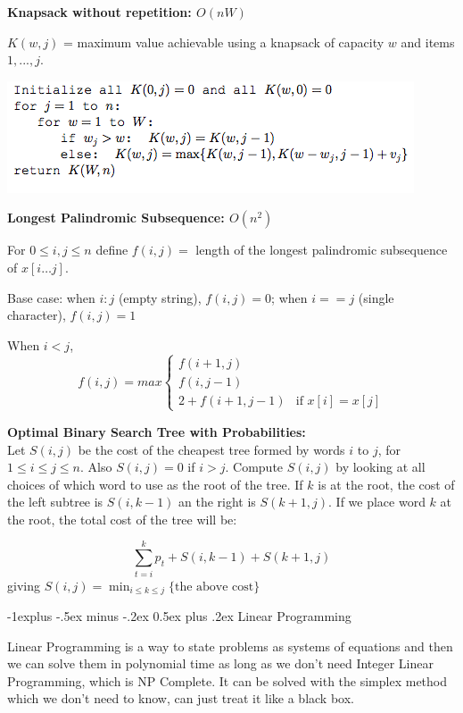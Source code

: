 \documentclass[landscape]{article}
\makeatletter
\renewcommand{\subsection}{\@startsection{subsection}{2}{0mm}%
                            {-1explus -.5ex minus -.2ex}%
                            {0.5ex plus .2ex}%
                            {\normalfont\normalsize\bfseries}}
\makeatother
\begin{document}
\begin{multicols}{3}
\textbf{Knapsack without repetition: $O(nW)$}

$K(w, j)$ = maximum value achievable using a knapsack of capacity $w$ and items $1, . . . , j$.

\includegraphics[scale=0.5]{knapWR}

\textbf{Longest Palindromic Subsequence: $O(n^2)$}

For $0\leq i,j\leq n$ define $f(i,j)=$ length of the longest palindromic subsequence of $x[i\ldots j]$.  

Base case: when $i:j$ (empty string), $ f(i,j) = 0$; when $i == j$ (single character), $f(i,j) = 1$

When $i<j$, 
\[
 f(i,j) = max
  \begin{cases}
   f(i+1,j) \\
   f(i,j-1)\\
   2+f(i+1,j-1) & \text{if } x [i] = x[j]
  \end{cases}
\]

\textbf{Optimal Binary Search Tree with Probabilities:} \\
Let $S(i,j)$ be the cost of the cheapest tree formed by words $i$ to $j$, for $1\leq i \leq j \leq n$. Also $S(i,j) = 0$ if $i>j$.  Compute $S(i,j)$ by looking at all choices of which word to use as the root of the tree.  If $k$ is at the root, the cost of the left subtree is $S(i,k-1)$ an the right is $S(k+1, j)$.  If we place word $k$ at the root, the total cost of the tree will be:

$$ \sum^k_{t=i} p_t + S(i,k-1) + S(k+1, j)$$
giving $S(i,j) = \min_{i\leq k \leq j}\{\text{the above cost}\}$

\subsection{Linear Programming}

Linear Programming is a way to state problems as systems of equations and then we can solve them in polynomial time as long as we don't need Integer Linear Programming, which is NP Complete.
It can be solved with the simplex method which we don't need to know, can just treat it like a black box.


\end{multicols}
\end{document}
